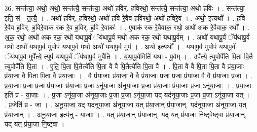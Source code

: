 \documentclass[17pt]{extarticle}
\begin{document}
36. सन्त॑त्या॒ अथो॒ अथो॒ सन्त॑त्यै॒ सन्त॑त्या॒ अथो॑ ह॒विर्. ह॒विरथो॒ सन्त॑त्यै॒ सन्त॑त्या॒ अथो॑ ह॒विः । . सन्त॑त्या॒ इति॒ सं - त॒त्यै॒ । . अथो॑ ह॒विर्. ह॒विरथो॒ अथो॑ ह॒वि रे॒वैव ह॒विरथो॒ अथो॑ ह॒विरे॒व । . अथो॒ इत्यथो᳚ । . ह॒वि रे॒वैव ह॒विर्. ह॒विरे॒वाक॑ रक रे॒व ह॒विर्. ह॒वि रे॒वाकः॑ । . ए॒वाक॑ रक रे॒वैवाक॒ रथो॒ अथो॑ अक रे॒वैवाक॒ रथो᳚ । . अ॒क॒ रथो॒ अथो॑ अक रक॒ रथो॑ यथापू॒र्वं ॅय॑थापू॒र्व मथो॑ अक रक॒ रथो॑ यथापू॒र्वम् । . अथो॑ यथापू॒र्वं ॅय॑थापू॒र्व मथो॒ अथो॑ यथापू॒र्व मुपोप॑ यथापू॒र्व मथो॒ अथो॑ यथापू॒र्व मुप॑ । . अथो॒ इत्यथो᳚ । . य॒था॒पू॒र्व मुपोप॑ यथापू॒र्वं ॅय॑थापू॒र्व मुपै᳚त्ये॒ त्युप॑ यथापू॒र्वं ॅय॑थापू॒र्व मुपै॑ति । . य॒था॒पू॒र्वमिति॑ यथा - पू॒र्वम् । . उपै᳚त्ये॒ त्युपोपै॑ति पि॒ता पि॒तै त्युपोपै॑ति पि॒ता । . ए॒ति॒ पि॒ता पि॒तैत्ये॑ति पि॒ता वै वै पि॒तैत्ये॑ति पि॒ता वै । . पि॒ता वै वै पि॒ता पि॒ता वै प्र॑या॒जाः प्र॑या॒जा वै पि॒ता पि॒ता वै प्र॑या॒जाः । . वै प्र॑या॒जाः प्र॑या॒जा वै वै प्र॑या॒जाः प्र॒जा प्र॒जा प्र॑या॒जा वै वै प्र॑या॒जाः प्र॒जा । . प्र॒या॒जाः प्र॒जा प्र॒जा प्र॑या॒जाः प्र॑या॒जाः प्र॒जा ऽनू॑या॒जा अ॑नूया॒जाः प्र॒जा प्र॑या॒जाः प्र॑या॒जाः प्र॒जा ऽनू॑या॒जाः । . प्र॒या॒जा इति॑ प्र - या॒जाः । . प्र॒जा ऽनू॑या॒जा अ॑नूया॒जाः प्र॒जा प्र॒जा ऽनू॑या॒जा यद् यद॑नूया॒जाः प्र॒जा प्र॒जा ऽनू॑या॒जा यत् । . प्र॒जेति॑ प्र - जा । . अ॒नू॒या॒जा यद् यद॑नूया॒जा अ॑नूया॒जा यत् प्र॑या॒जान् प्र॑या॒जान्. यद॑नूया॒जा अ॑नूया॒जा यत् प्र॑या॒जान् । . अ॒नू॒या॒जा इत्य॑नु - या॒जाः । . यत् प्र॑या॒जान् प्र॑या॒जान्. यद् यत् प्र॑या॒जा नि॒ष्ट्वेष्ट्वा प्र॑या॒जान्. यद् यत् प्र॑या॒जा नि॒ष्ट्वा । \newline
\end{document}
